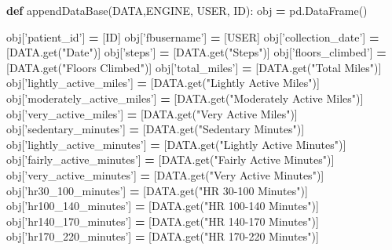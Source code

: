 \documentclass[]{book}
\newenvironment{Shaded}{\begin{snugshade}}{\end{snugshade}}
\newcommand{\KeywordTok}[1]{\textcolor[rgb]{0.13,0.29,0.53}{\textbf{#1}}}
\newcommand{\StringTok}[1]{\textcolor[rgb]{0.31,0.60,0.02}{#1}}
\newcommand{\OperatorTok}[1]{\textcolor[rgb]{0.81,0.36,0.00}{\textbf{#1}}}
\newcommand{\NormalTok}[1]{#1}
\begin{document}
\begin{Shaded}
\begin{Highlighting}[]
\KeywordTok{def}\NormalTok{ appendDataBase(DATA,ENGINE, USER, ID):}
\NormalTok{    obj }\OperatorTok{=}\NormalTok{ pd.DataFrame()}
   
\NormalTok{    obj[}\StringTok{'patient_id'}\NormalTok{] }\OperatorTok{=}\NormalTok{ [ID]}
\NormalTok{    obj[}\StringTok{'fbusername'}\NormalTok{] }\OperatorTok{=}\NormalTok{ [USER]}
\NormalTok{    obj[}\StringTok{'collection_date'}\NormalTok{] }\OperatorTok{=}\NormalTok{ [DATA.get(}\StringTok{"Date"}\NormalTok{)]}
\NormalTok{    obj[}\StringTok{'steps'}\NormalTok{] }\OperatorTok{=}\NormalTok{ [DATA.get(}\StringTok{"Steps"}\NormalTok{)]}
\NormalTok{    obj[}\StringTok{'floors_climbed'}\NormalTok{] }\OperatorTok{=}\NormalTok{ [DATA.get(}\StringTok{"Floors Climbed"}\NormalTok{)]}
\NormalTok{    obj[}\StringTok{'total_miles'}\NormalTok{] }\OperatorTok{=}\NormalTok{ [DATA.get(}\StringTok{"Total Miles"}\NormalTok{)]}
\NormalTok{    obj[}\StringTok{'lightly_active_miles'}\NormalTok{] }\OperatorTok{=}\NormalTok{ [DATA.get(}\StringTok{"Lightly Active Miles"}\NormalTok{)]}
\NormalTok{    obj[}\StringTok{'moderately_active_miles'}\NormalTok{] }\OperatorTok{=}\NormalTok{ [DATA.get(}\StringTok{"Moderately Active Miles"}\NormalTok{)]}
\NormalTok{    obj[}\StringTok{'very_active_miles'}\NormalTok{] }\OperatorTok{=}\NormalTok{ [DATA.get(}\StringTok{"Very Active Miles"}\NormalTok{)]}
\NormalTok{    obj[}\StringTok{'sedentary_minutes'}\NormalTok{] }\OperatorTok{=}\NormalTok{ [DATA.get(}\StringTok{"Sedentary Minutes"}\NormalTok{)]}
\NormalTok{    obj[}\StringTok{'lightly_active_minutes'}\NormalTok{] }\OperatorTok{=}\NormalTok{ [DATA.get(}\StringTok{"Lightly Active Minutes"}\NormalTok{)]}
\NormalTok{    obj[}\StringTok{'fairly_active_minutes'}\NormalTok{] }\OperatorTok{=}\NormalTok{ [DATA.get(}\StringTok{"Fairly Active Minutes"}\NormalTok{)]}
\NormalTok{    obj[}\StringTok{'very_active_minutes'}\NormalTok{] }\OperatorTok{=}\NormalTok{ [DATA.get(}\StringTok{"Very Active Minutes"}\NormalTok{)]}
\NormalTok{    obj[}\StringTok{'hr30_100_minutes'}\NormalTok{] }\OperatorTok{=}\NormalTok{ [DATA.get(}\StringTok{"HR 30-100 Minutes"}\NormalTok{)]}
\NormalTok{    obj[}\StringTok{'hr100_140_minutes'}\NormalTok{] }\OperatorTok{=}\NormalTok{ [DATA.get(}\StringTok{"HR 100-140 Minutes"}\NormalTok{)]}
\NormalTok{    obj[}\StringTok{'hr140_170_minutes'}\NormalTok{] }\OperatorTok{=}\NormalTok{ [DATA.get(}\StringTok{"HR 140-170 Minutes"}\NormalTok{)]}
\NormalTok{    obj[}\StringTok{'hr170_220_minutes'}\NormalTok{] }\OperatorTok{=}\NormalTok{ [DATA.get(}\StringTok{"HR 170-220 Minutes"}\NormalTok{)]}

\end{Highlighting}
\end{Shaded}
\end{document}
